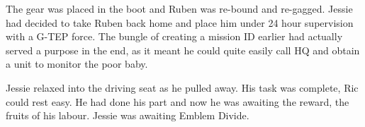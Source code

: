 The gear was placed in the boot and Ruben was re-bound and re-gagged.  Jessie had decided to take Ruben back home and place him under 24 hour supervision with a G-TEP force.  The bungle of creating a mission ID earlier had actually served a purpose in the end, as it meant he could quite easily call HQ and obtain a unit to monitor the poor baby.

Jessie relaxed into the driving seat as he pulled away.  His task was complete, Ric could rest easy.  He had done his part and now he was awaiting the reward, the fruits of his labour.  Jessie was awaiting Emblem Divide.




